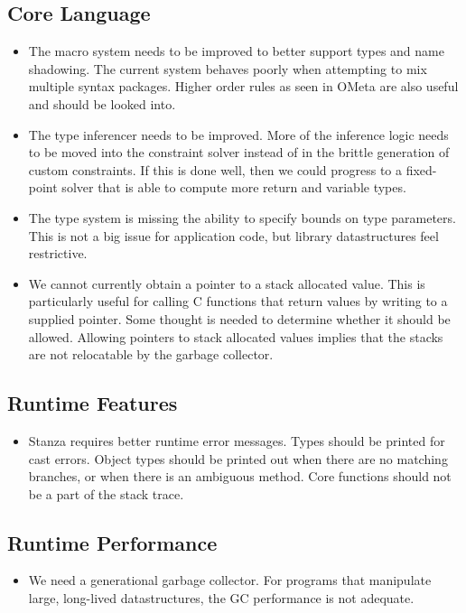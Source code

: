 \documentclass[fleqn, 12pt]{article}
\begin{document}
\subsection*{Core Language}
\begin{itemize}
\item The macro system needs to be improved to better support types and name shadowing. The current system behaves poorly when attempting to mix multiple syntax packages. Higher order rules as seen in OMeta are also useful and should be looked into.

\item The type inferencer needs to be improved. More of the inference logic needs to be moved into the constraint solver instead of in the brittle generation of custom constraints. If this is done well, then we could progress to a fixed-point solver that is able to compute more return and variable types. 

\item The type system is missing the ability to specify bounds on type parameters. This is not a big issue for application code, but library datastructures feel restrictive.

\item We cannot currently obtain a pointer to a stack allocated value. This is particularly useful for calling C functions that return values by writing to a supplied pointer. Some thought is needed to determine whether it should be allowed. Allowing pointers to stack allocated values implies that the stacks are not relocatable by the garbage collector.
\end{itemize}

\subsection*{Runtime Features}
\begin{itemize}
\item Stanza requires better runtime error messages. Types should be printed for cast errors. Object types should be printed out when there are no matching branches, or when there is an ambiguous method. Core functions should not be a part of the stack trace.
\end{itemize}

\subsection*{Runtime Performance}
\begin{itemize}
\item We need a generational garbage collector. For programs that manipulate large, long-lived datastructures, the GC performance is not adequate.
\end{itemize}
\end{document}

